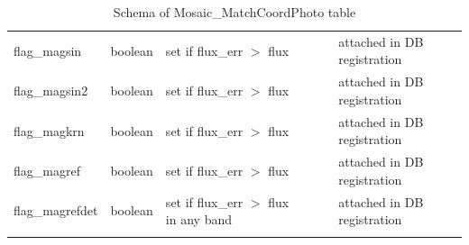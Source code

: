 \documentclass[12pt]{article}
\begin{document}
\begin{table}[thbp]
\begin{center}
{\begin{tabular}{llllll}
flag\_magsin & boolean & set if flux\_err $>$ flux                                   &                           &                  & attached in DB registration  \\
flag\_magsin2 & boolean & set if flux\_err $>$ flux                                   &                           &                  & attached in DB registration  \\
flag\_magkrn & boolean & set if flux\_err $>$ flux                                   &                           &                  & attached in DB registration  \\
flag\_magref & boolean & set if flux\_err $>$ flux                                   &                           &                  & attached in DB registration  \\
flag\_magrefdet & boolean & set if flux\_err $>$ flux in any band                       &                           &                  & attached in DB registration  \\
\hline\\
\end{tabular}
}
\caption{Schema of Mosaic\_MatchCoordPhoto table}
\end{center}
\end{table}

\clearpage
\end{document}
